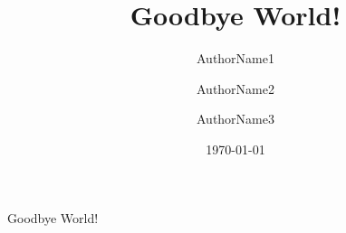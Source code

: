 \documentclass{report}
\author[1]{AuthorName1}
\author[2]{AuthorName2}
\author[3]{AuthorName3}
\affil[1]{Institute 1, Address 1}
\affil[2]{Institute 2, Address 2}
\affil[3]{Institute 3, Address 3}
\title{Goodbye World!}
\date{\today}
\begin{document}
	\maketitle 
	Goodbye World!
\end{document}
